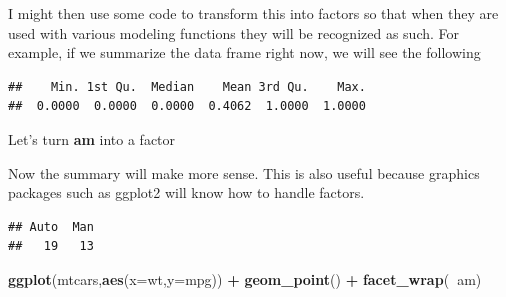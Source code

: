 \documentclass[]{book}
\newenvironment{Shaded}{\begin{snugshade}}{\end{snugshade}}
\newcommand{\DataTypeTok}[1]{\textcolor[rgb]{0.13,0.29,0.53}{#1}}
\newcommand{\DecValTok}[1]{\textcolor[rgb]{0.00,0.00,0.81}{#1}}
\newcommand{\KeywordTok}[1]{\textcolor[rgb]{0.13,0.29,0.53}{\textbf{#1}}}
\newcommand{\NormalTok}[1]{#1}
\newcommand{\OperatorTok}[1]{\textcolor[rgb]{0.81,0.36,0.00}{\textbf{#1}}}
\newcommand{\StringTok}[1]{\textcolor[rgb]{0.31,0.60,0.02}{#1}}
\begin{document}
I might then use some code to transform this into factors so that when they are used with various modeling functions they will be recognized as such. For example, if we summarize the data frame right now, we will see the following

\begin{Shaded}
\end{Shaded}

\begin{verbatim}
##    Min. 1st Qu.  Median    Mean 3rd Qu.    Max. 
##  0.0000  0.0000  0.0000  0.4062  1.0000  1.0000
\end{verbatim}

Let's turn \textbf{am} into a factor

\begin{Shaded}
\end{Shaded}

Now the summary will make more sense. This is also useful because graphics packages such as ggplot2 will know how to handle factors.

\begin{Shaded}
\end{Shaded}

\begin{verbatim}
## Auto  Man 
##   19   13
\end{verbatim}

\begin{Shaded}
\begin{Highlighting}[]
\KeywordTok{ggplot}\NormalTok{(mtcars,}\KeywordTok{aes}\NormalTok{(}\DataTypeTok{x=}\NormalTok{wt,}\DataTypeTok{y=}\NormalTok{mpg)) }\OperatorTok{+}\StringTok{ }
\StringTok{  }\KeywordTok{geom_point}\NormalTok{() }\OperatorTok{+}\StringTok{ }
\StringTok{  }\KeywordTok{facet_wrap}\NormalTok{(}\OperatorTok{~}\NormalTok{am)}
\end{Highlighting}
\end{Shaded}
\end{document}
